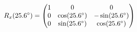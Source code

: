 \documentclass[preview]{standalone}
\begin{document}
\begin{align*}
\special{dvisvgm:raw <g id='unique000'>}R_x(25.6^\circ) = \begin{pmatrix} 1 & 0 & 0 \\ 0 & \cos(25.6^\circ) & -\sin(25.6^\circ) \\ 0 & \sin(25.6^\circ) & \cos(25.6^\circ) \end{pmatrix}\special{dvisvgm:raw </g>}
\end{align*}
\end{document}

